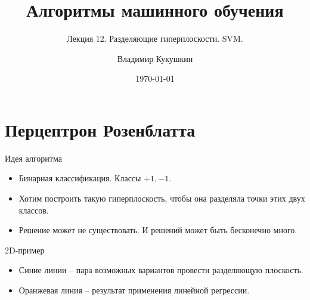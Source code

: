 \documentclass[9pt]{beamer}
\title{Алгоритмы машинного обучения}
\subtitle{Лекция 12. Разделяющие гиперплоскости. SVM.}
\author{Владимир Кукушкин}
\institute{СПбГЭУ - 2020}
\date{\today}
\begin{document}
\titlepage

\section{Перцептрон Розенблатта}

\begin{frame}{Идея алгоритма}
    \begin{itemize}
        \item Бинарная классификация. Классы $+1, -1$.
        \item Хотим построить такую гиперплоскость, чтобы она разделяла точки этих двух классов.
        \item Решение может не существовать. И решений может быть бесконечно много.
    \end{itemize}
\end{frame}

\begin{frame}{2D-пример}
    \begin{itemize}
        \item Синие линии -- пара возможных вариантов провести разделяющую плоскость.
        \item Оранжевая линия -- результат применения линейной регрессии.
    \end{itemize}
\end{frame}
\end{document}
